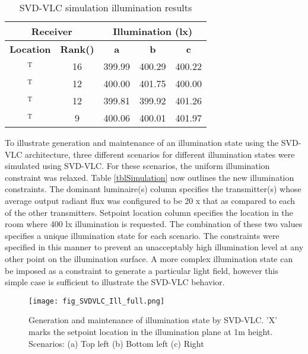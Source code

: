 \renewcommand{\arraystretch}{1.1}
\begin{table}[!b] %
\caption{SVD-VLC simulation illumination results}
\label{tblSimulation2}
\centering
	\begin{tabular}{|c|c|c|c|c|}
		\hline
		\multicolumn{2}{|c|}{\bf{Receiver}} & \multicolumn{3}{|c|}{\bf{Illumination (lx)}}\\
		\hline
		{\bf{Location}} & {\bf{Rank(\vm{H})}} & {\bf{a}} & {\bf{b}} & {\bf{c}}\\
		\hline
		[1.6 0.6 1.0]$^{\text{T}}$ & 16 & 399.99 & 400.29 & 400.22\\
		\hline
		[2.8 0.4 1.4]$^{\text{T}}$ & 12 & 400.00 & 401.75 & 400.00\\
		\hline
		[0.2 0.8 1.0]$^{\text{T}}$ & 12 & 399.81 & 399.92 & 401.26\\
		\hline
		[1.2 1.4 1.6]$^{\text{T}}$ & 9 & 400.06 & 400.01 & 401.97\\
		\hline
	\end{tabular}
\end{table}
\renewcommand{\arraystretch}{1.0}
To  illustrate generation and maintenance of an illumination state using the SVD-VLC architecture, three different scenarios for different illumination states were simulated using SVD-VLC. For these scenarios, the uniform illumination constraint was relaxed. Table \ref{tblSimulation} now outlines the new illumination constraints. The dominant luminaire(s) column specifies the transmitter(s) whose average output radiant flux  was configured to be 20 x that as compared to each of the other transmitters. Setpoint location column specifies the location in the room where 400 lx illumination is requested. The combination of these two values specifies a unique illumination state for each scenario. The constraints were specified in this manner to prevent an unacceptably high illumination level at any other point on the illumination surface. A more complex illumination state can be imposed as a constraint to generate a particular light field, however this simple case is sufficient to illustrate the SVD-VLC behavior.

\begin{figure}[!t]
	\centering
		\texttt{[image: fig\_SVDVLC\_Ill\_full.png]}
	\caption[Generation and maintenance of illumination state by SVD-VLC]{Generation and maintenance of illumination state by SVD-VLC. 'X' marks the setpoint location in the illumination plane at 1m height. Scenarios: (a) Top left (b) Bottom left (c) Right }
	\label{figIllSVD}
\end{figure}

